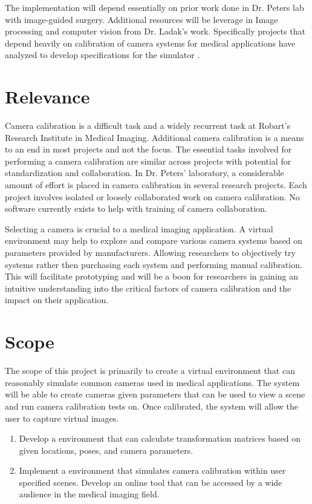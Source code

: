 \documentclass[11pt]{report}
\begin{document}
The implementation will depend essentially on prior work done in Dr. Peters lab with image-guided surgery. Additional resources will be leverage in Image processing and computer vision from Dr. Ladak's work. Specifically projects that depend heavily on calibration of camera systems for medical applications have analyzed to develop specifications for the simulator \cite{CC}. 
 

\section{Relevance}

Camera calibration is a difficult task and a widely recurrent task at Robart's Research Institute in Medical Imaging. Additional camera calibration is a means to an end in most projects and not the focus. The essential tasks involved for performing a camera calibration are similar across projects with potential for standardization and collaboration. In Dr. Peters' laboratory, a considerable amount of effort is placed in camera calibration in several research projects. Each project involves isolated or loosely collaborated work on camera calibration. No software currently exists to help with training of camera collaboration. 

Selecting a camera is crucial to a medical imaging application. A virtual environment may help to explore and compare various camera systems based on parameters provided by manufacturers. Allowing researchers to objectively try systems rather then purchasing each system and performing manual calibration. This will facilitate prototyping and will be a boon for researchers in  gaining an intuitive understanding into the critical factors of camera calibration and the impact on their application. 

\section{Scope}
The scope of this project is primarily to create a virtual environment that can reasonably simulate common cameras used in medical applications. The system will be able to create cameras given parameters that can be used to view a scene and run camera calibration tests on. Once calibrated, the system will allow the user to capture virtual images. 
 
\begin{enumerate}
\item Develop a  environment that can calculate transformation matrices based on given locations, poses, and camera parameters.  
\item Implement a  environment that simulates camera calibration within user specified scenes. Develop an online tool that can be accessed by a wide audience in the medical imaging field.
\end{enumerate}
\end{document}
